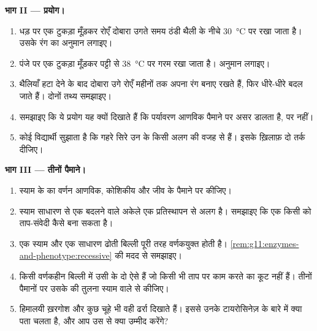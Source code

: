 \begin{problem}
\medskip
\noindent\textbf{भाग II --- प्रयोग।}
\begin{enumerate}[resume]
  \item धड़ पर एक टुकड़ा मूँड़कर रोएँ दोबारा उगते समय ठंडी थैली के नीचे
        \qty{30}{\celsius} पर रखा जाता है। उसके रंग का अनुमान लगाइए।
  \item पंजे पर एक टुकड़ा मूँड़कर पट्टी से \qty{38}{\celsius} पर गरम रखा
        जाता है। अनुमान लगाइए।
  \item थैलियाँ हटा देने के बाद दोबारा उगे रोएँ महीनों तक अपना रंग बनाए
        रखते हैं, फिर धीरे-धीरे बदल जाते हैं। दोनों तथ्य समझाइए।
  \item समझाइए कि ये प्रयोग यह क्यों दिखाते हैं कि पर्यावरण आणविक पैमाने
        पर असर डालता है,  पर नहीं।
  \item कोई विद्यार्थी सुझाता है कि गहरे सिरे उन  के किसी अलग
         की वजह से हैं। इसके ख़िलाफ़ दो तर्क दीजिए।
\end{enumerate}

\medskip
\noindent\textbf{भाग III --- तीनों पैमाने।}
\begin{enumerate}[resume]
  \item स्याम के  का वर्णन आणविक, कोशिकीय और जीव के पैमाने पर
        कीजिए।
  \item स्याम  साधारण  से एक  बदलने वाले अकेले एक
        प्रतिस्थापन से अलग है। समझाइए कि एक  किसी  को
        ताप-संवेदी कैसे बना सकता है।
  \item एक स्याम और एक साधारण  ढोती बिल्ली पूरी तरह वर्णकयुक्त
        होती है। \cref{rem:g11:enzymes-and-phenotype:recessive} की मदद से
        समझाइए।
  \item किसी वर्णकहीन बिल्ली में उसी  के दो ऐसे  हैं जो किसी भी
        ताप पर काम करते  का कूट नहीं हैं। तीनों पैमानों पर उसके
         की तुलना स्याम वाले से कीजिए।
  \item हिमालयी ख़रगोश और कुछ चूहे भी वही ढर्रा दिखाते हैं। इससे उनके
        टायरोसिनेज़  के बारे में क्या पता चलता है, और आप उस
         से क्या उम्मीद करेंगे?
\end{enumerate}


\end{problem}
